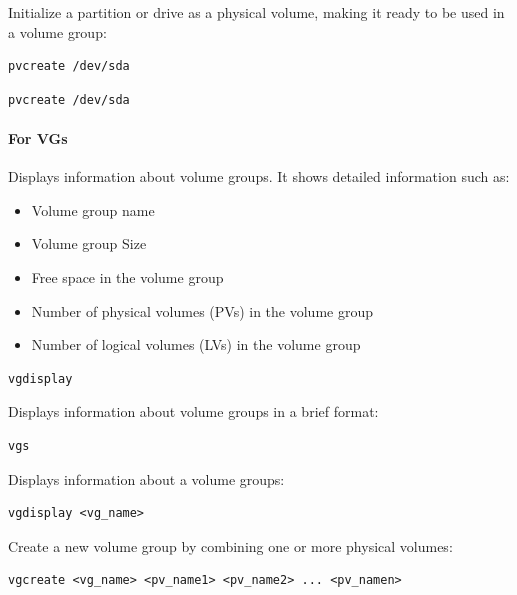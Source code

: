 \documentclass{article}
\newenvironment{codetemplate}[1][]{%
  \mybasecolorbox[#1]
  \itshape
}{%
  \endmybasecolorbox
}
\begin{document}
Initialize a partition or drive as a physical volume, making it ready to be used in a volume group:
\begin{codetemplate}
\begin{verbatim}
pvcreate /dev/sda
\end{verbatim}
\end{codetemplate}
\begin{codetemplate}
\begin{verbatim}
pvcreate /dev/sda
\end{verbatim}
\end{codetemplate}

\paragraph{For VGs}

Displays information about volume groups. It shows detailed information such as:
\begin{itemize}
    \item Volume group name
    \item Volume group Size
    \item Free space in the volume group
    \item Number of physical volumes (PVs) in the volume group
    \item Number of logical volumes (LVs) in the volume group
\end{itemize}
\begin{codetemplate}
\begin{verbatim}
vgdisplay
\end{verbatim}
\end{codetemplate}

Displays information about volume groups in a brief format:
\begin{codetemplate}
\begin{verbatim}
vgs
\end{verbatim}
\end{codetemplate}

Displays information about a volume groups:
\begin{codetemplate}
\begin{verbatim}
vgdisplay <vg_name>
\end{verbatim}
\end{codetemplate}

Create a new volume group by combining one or more physical volumes:
\begin{codetemplate}
\begin{verbatim}
vgcreate <vg_name> <pv_name1> <pv_name2> ... <pv_namen>
\end{verbatim}
\end{codetemplate}
\end{document}
